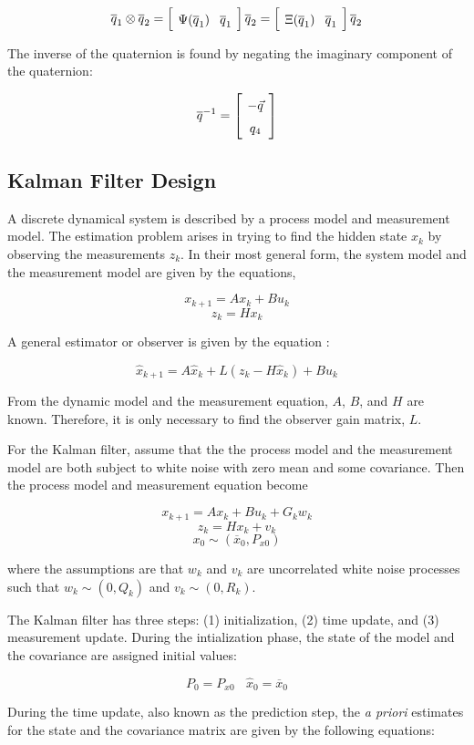 \documentclass{article}
\newcommand{\mat}[2][ccccccccccccccccccccccccccccccccccccccccccccc]{\left[
        \arraycolsep=4pt\def\arraystretch{1.5}
        \begin{array}{#1} #2 \\ 
        \end{array} 
        \right]}
\begin{document}
\begin{flushleft}
\[ \overline{q}_1 \otimes \overline{q}_2 = \mat{ \Psi({\overline{q}_1}) & \overline{q}_1} \overline{q}_2 = \mat{ \Xi({\overline{q}_1}) & \overline{q}_1 } \overline{q}_2 \]

The inverse of the quaternion is found by negating the imaginary component of the quaternion: 

\[ \overline{q}^{-1} = \mat{ -\vec{q} \\ q_4 } \]

\subsection{Kalman Filter Design} 

A discrete dynamical system is described by a process model and measurement model. The estimation problem arises in trying to find the hidden state $x_k$ by observing the measurements $z_k$. In their most general form, the system model and the measurement model are given by the equations, 

\[ x_{k+1} = A x_k + B u_k \]
\[ z_k = H x_k \]

A general estimator or observer is given by the equation \cite{Lewis2007}: 

\[ \hat{x}_{k+1} = A \hat{x}_k + L (z_k - H \hat{x}_k) + B u_k \]

From the dynamic model and the measurement equation, $A$, $B$, and $H$ are known. Therefore, it is only necessary to find the observer gain matrix, $L$. 

\medskip

For the Kalman filter, assume that the the process model and the measurement model are both subject to white noise with zero mean and some covariance. Then the process model and measurement equation become 

\[ x_{k+1} = A x_k + B u_k + G_k w_k \]
\[ z_k = H x_k + v_k \]
\[ x_0 \sim (\overline{x}_0, P_{x0}) \]

where the assumptions are that {$w_k$} and {$v_k$} are uncorrelated white noise processes such that $w_k \sim (0, Q_k)$ and $v_k \sim (0,R_k)$. 

\medskip

The Kalman filter has three steps: (1) initialization, (2) time update, and (3) measurement update. During the intialization phase, the state of the model and the covariance are assigned initial values: 

\[ P_0 = P_{x0}  \ \ \ \  \hat{x}_0 = \overline{x}_0 \]

During the time update, also known as the prediction step, the \textit{a priori} estimates for the state and the covariance matrix are given by the following equations: 


\end{flushleft}
\end{document}
